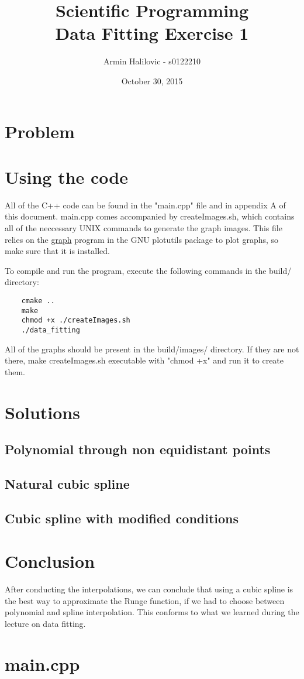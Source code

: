 \documentclass[11pt, a4paper, titlepage, openright]{article}
\title{\LARGE Scientific Programming \\ \normalsize Data Fitting Exercise 1}
\author{Armin Halilovic - s0122210}
\date{October 30, 2015}
\begin{document}

\onecolumn
\tableofcontents
\newpage


\section{Problem}
\section{Using the code}
    All of the C++ code can be found in the "main.cpp" file and in appendix A of this document.
    main.cpp comes accompanied by createImages.sh, which contains all of the neccessary UNIX commands to generate the graph images.
    This file relies on the \href{https://www.gnu.org/software/plotutils/manual/en/html_node/graph.html}{graph} program
    in the GNU plotutils package to plot graphs, so make sure that it is installed.

    To compile and run the program, execute the following commands in the build/ directory:
    \begin{lstlisting}
    cmake ..
    make
    chmod +x ./createImages.sh
    ./data_fitting
    \end{lstlisting}
    All of the graphs should be present in the build/images/ directory. If they are not there, make createImages.sh executable
    with "chmod +x" and run it to create them.

\newpage
\section{Solutions}
\subsection{Polynomial through non equidistant points}
\subsection{Natural cubic spline}
\subsection{Cubic spline with modified conditions}

\section{Conclusion}
    After conducting the interpolations, we can conclude that using a cubic spline is the best way to
    approximate the Runge function, if we had to choose between polynomial and spline interpolation.
    This conforms to what we learned during the lecture on data fitting.



\onecolumn
\appendix
\appendixpage
\addappheadtotoc

\section{main.cpp}
    
    \newpage

%    
\end{document}
